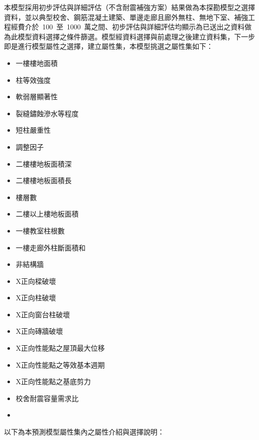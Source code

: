 本模型採用初步評估與詳細評估（不含耐震補強方案）結果做為本探勘模型之選擇資料，並以典型校舍、鋼筋混凝土建築、單邊走廊且廊外無柱、無地下室、補強工程經費介於~100~至~1000~萬之間、初步評估與詳細評估均顯示為已送出之資料做為此模型資料選擇之條件篩選。模型經資料選擇與前處理之後建立資料集，下一步即是進行模型屬性之選擇，建立屬性集，本模型挑選之屬性集如下：

\begin{multicols}{2}
\begin{itemize}
\item 一樓樓地面積
\item 柱等效強度
\item 軟弱層顯著性
\item 裂縫鏽蝕滲水等程度
\item 短柱嚴重性
\item 調整因子
\item 二樓樓地板面積深
\item 二樓樓地板面積長
\item 樓層數
\item 二樓以上樓地板面積
\item 一樓教室柱根數
\item 一樓走廊外柱斷面積和
\item 非結構牆
\item X正向樑破壞
\item X正向柱破壞
\item X正向窗台柱破壞
\item X正向磚牆破壞
\item X正向性能點之屋頂最大位移
\item X正向性能點之等效基本週期
\item X正向性能點之基底剪力
\item 校舍耐震容量需求比
\item[]
\end{itemize}
\end{multicols}

以下為本預測模型屬性集內之屬性介紹與選擇說明：

